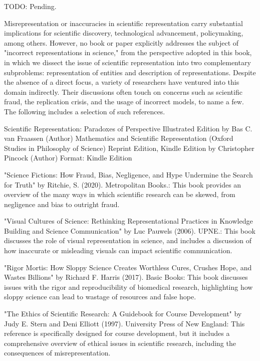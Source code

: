 {\color{red} TODO: Pending.}

Misrepresentation or inaccuracies in scientific representation carry substantial implications for scientific discovery, technological advancement, policymaking, among others. However, no book or paper explicitly addresses the subject of "incorrect representations in science," from the perspective adopted in this book, in which we dissect the issue of scientific representation into two complementary subproblems: representation of entities and description of representations. Despite the absence of a direct focus, a variety of researchers have ventured into this domain indirectly. Their discussions often touch on concerns such as scientific fraud, the replication crisis, and the usage of incorrect models, to name a few. The following includes a selection of such references.

Scientific Representation: Paradoxes of Perspective Illustrated Edition
by Bas C. van Fraassen (Author)
Mathematics and Scientific Representation (Oxford Studies in Philosophy of Science) Reprint Edition, Kindle Edition
by Christopher Pincock (Author)  Format: Kindle Edition

"Science Fictions: How Fraud, Bias, Negligence, and Hype Undermine the Search for Truth" by Ritchie, S. (2020). Metropolitan Books.: This book provides an overview of the many ways in which scientific research can be skewed, from negligence and bias to outright fraud.

"Visual Cultures of Science: Rethinking Representational Practices in Knowledge Building and Science Communication" by Luc Pauwels (2006). UPNE.: This book discusses the role of visual representation in science, and includes a discussion of how inaccurate or misleading visuals can impact scientific communication.

"Rigor Mortis: How Sloppy Science Creates Worthless Cures, Crushes Hope, and Wastes Billions" by Richard F. Harris (2017). Basic Books: This book discusses issues with the rigor and reproducibility of biomedical research, highlighting how sloppy science can lead to wastage of resources and false hope.

"The Ethics of Scientific Research: A Guidebook for Course Development" by Judy E. Stern and Deni Elliott (1997). University Press of New England: This reference is specifically designed for course development, but it includes a comprehensive overview of ethical issues in scientific research, including the consequences of misrepresentation.

